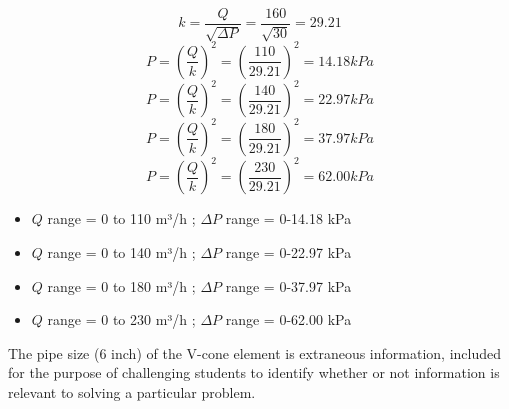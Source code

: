 




$$k=\frac{Q}{\sqrt{\Delta P}}=\frac{160}{\sqrt{30}}=29.21$$
$$P=\left( \frac{Q}{k} \right)^2=\left( \frac{110}{29.21} \right)^2=14.18kPa$$
$$P=\left( \frac{Q}{k} \right)^2=\left( \frac{140}{29.21} \right)^2=22.97kPa$$
$$P=\left( \frac{Q}{k} \right)^2=\left( \frac{180}{29.21} \right)^2=37.97kPa$$
$$P=\left( \frac{Q}{k} \right)^2=\left( \frac{230}{29.21} \right)^2=62.00kPa$$
\begin{itemize}
\item{} $Q$ range = 0 to 110 m³/h ; $\Delta P$ range = 0-14.18 kPa
\vskip 5pt
\item{} $Q$ range = 0 to 140 m³/h ; $\Delta P$ range = 0-22.97 kPa
\vskip 5pt
\item{} $Q$ range = 0 to 180 m³/h ; $\Delta P$ range = 0-37.97 kPa
\vskip 5pt
\item{} $Q$ range = 0 to 230 m³/h ; $\Delta P$ range = 0-62.00 kPa
\end{itemize}

\vskip 10pt

The pipe size (6 inch) of the V-cone element is extraneous information, included for the purpose of challenging students to identify whether or not information is relevant to solving a particular problem.





